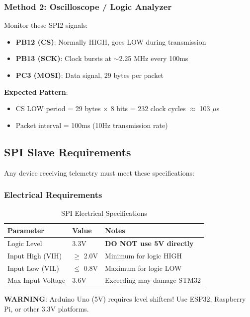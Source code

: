 \documentclass[11pt,a4paper]{article}
\begin{document}
\subsubsection{Method 2: Oscilloscope / Logic Analyzer}

Monitor these SPI2 signals:
\begin{itemize}
    \item \textbf{PB12 (CS)}: Normally HIGH, goes LOW during transmission
    \item \textbf{PB13 (SCK)}: Clock bursts at $\sim$2.25 MHz every 100ms
    \item \textbf{PC3 (MOSI)}: Data signal, 29 bytes per packet
\end{itemize}

\textbf{Expected Pattern}:
\begin{itemize}
    \item CS LOW period = 29 bytes $\times$ 8 bits = 232 clock cycles $\approx$ 103 $\mu$s
    \item Packet interval = 100ms (10Hz transmission rate)
\end{itemize}

\subsection{SPI Slave Requirements}

Any device receiving telemetry must meet these specifications:

\subsubsection{Electrical Requirements}

\begin{table}[H]
\centering
\begin{tabular}{@{}lll@{}}
\toprule
\textbf{Parameter} & \textbf{Value} & \textbf{Notes} \\
\midrule
Logic Level & 3.3V & \textbf{DO NOT use 5V directly} \\
Input High (VIH) & $\geq$ 2.0V & Minimum for logic HIGH \\
Input Low (VIL) & $\leq$ 0.8V & Maximum for logic LOW \\
Max Input Voltage & 3.6V & Exceeding may damage STM32 \\
\bottomrule
\end{tabular}
\caption{SPI Electrical Specifications}
\end{table}

\textbf{WARNING}: Arduino Uno (5V) requires level shifters! Use ESP32, Raspberry Pi, or other 3.3V platforms.
\end{document}
